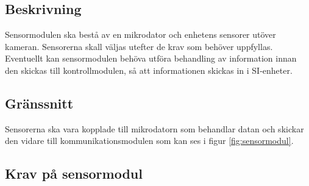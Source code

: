 \documentclass[kravspec/krav.tex]{subfiles}
\begin{document}
\subsection{Beskrivning}
Sensormodulen ska bestå av en mikrodator och enhetens sensorer utöver kameran.
Sensorerna skall väljas utefter de krav som behöver uppfyllas. Eventuellt kan
sensormodulen behöva utföra behandling av information innan den skickas till
kontrollmodulen, så att informationen skickas in i SI-enheter.

\subsection{Gränssnitt}
Sensorerna ska vara kopplade till mikrodatorn som behandlar datan och skickar
den vidare till kommunikationsmodulen som kan ses i figur
\ref{fig:sensormodul}.

\subsection{Krav på sensormodul}
\begin{reqlist}
\end{reqlist}
\end{document}
